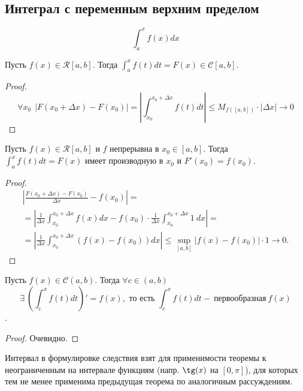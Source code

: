 \subsection{Интеграл с переменным верхним пределом}
\[\int_{a}^{x} f(x) dx\]
\begin{theorem}
    Пусть $f(x)\in \mathcal{R}[a, b]$. Тогда $\int_{a}^{x} f(t) dt = F(x) \in \mathcal{C}[a, b]$.
\end{theorem}
\begin{proof}
    \[\forall x_0 \ \ |F(x_0 + \Delta x) - F(x_0)| = |\int_{x_0}^{x_0 + \Delta x} f(t) dt| \leq M_{f([a, b])}\cdot |\Delta x| \rightarrow 0\]
\end{proof}
\begin{theorem}
    Пусть $f(x)\in \mathcal{R}[a, b]$ и $f$ непрерывна в $x_0 \in [a, b]$. Тогда $\int_{a}^{x} f(t) dt = F(x)$ имеет производную в $x_0$ и $F'(x_0) = f(x_0)$.
\end{theorem}
\begin{proof}
    \begin{multline*}
        |\frac{F(x_0 + \Delta x) - F(x_0)}{\Delta x} - f(x_0)| =\\= |\frac{1}{\Delta x}\int_{x_0}^{x_0 + \Delta x} f(x) dx - f(x_0)\cdot\frac{1}{\Delta x}\int_{x_0}^{x_0 + \Delta x} 1\ dx| =\\= |\frac{1}{\Delta x}\int_{x_0}^{x_0 + \Delta x} (f(x) - f(x_0)) dx| \leq \sup \limits_{[a, b]}|f(x) - f(x_0)|\cdot 1 \longrightarrow 0.
    \end{multline*}
\end{proof}
\begin{consequense}
    Пусть $f(x) \in \mathcal{C}(a, b)$. Тогда $\forall c \in (a, b)$
    \[\exists \ (\int_{c}^{x} f(t)dt)' = f(x), \text{ то есть } \int_{c}^{x} f(t)dt - \ \text{первообразная} \ f(x)\].
\end{consequense}
\begin{proof}
    Очевидно.
\end{proof}
\begin{comm}
    Интервал в формулировке следствия взят для применимости теоремы к неограниченным на интервале функциям (напр. $\tg(x)$ на $[0, \pi]$), для которых тем не менее применима предыдущая теорема по аналогичным рассуждениям.
\end{comm}